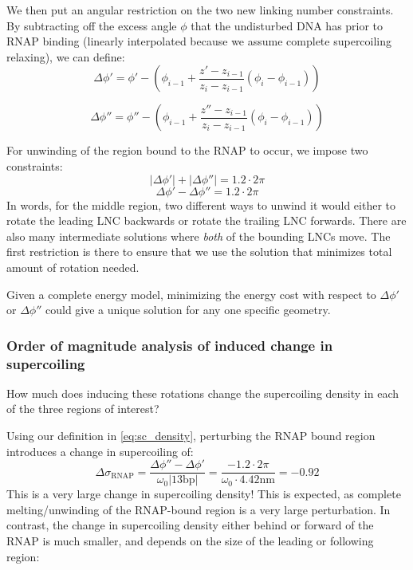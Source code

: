 \documentclass[11pt]{article}
\begin{document}
We then put an angular restriction on the two new linking number constraints. By subtracting off the excess angle \(\phi\) that the undisturbed DNA has prior to RNAP binding (linearly interpolated because we assume complete supercoiling relaxing), we can define:
\begin{equation}
    \Delta \phi' = \phi' - \left(\phi_{i - 1} + \frac{z' - z_{i-1}}{z_i - z_{i-1}} (\phi_i - \phi_{i-1})\right)
\end{equation}

\begin{equation}
    \Delta \phi'' = \phi'' - \left(\phi_{i - 1} + \frac{z'' - z_{i-1}}{z_i - z_{i-1}} (\phi_i - \phi_{i-1})\right)
\end{equation}

For unwinding of the region bound to the RNAP to occur, we impose two constraints:
\begin{equation}
    |\Delta \phi'| + |\Delta \phi''| = 1.2 \cdot 2 \pi
\end{equation}
\begin{equation}
    \Delta \phi' - \Delta \phi'' = 1.2 \cdot 2\pi
\end{equation}
In words, for the middle region, two different ways to unwind it would either to rotate the leading LNC backwards or rotate the trailing LNC forwards. There are also many intermediate solutions where \emph{both} of the bounding LNCs move. The first restriction is there to ensure that we use the solution that minimizes total amount of rotation needed.

Given a complete energy model, minimizing the energy cost with respect to \(\Delta \phi'\) or \(\Delta \phi''\) could give a unique solution for any one specific geometry.

\subsubsection{Order of magnitude analysis of induced change in supercoiling}
How much does inducing these rotations change the supercoiling density in each of the three regions of interest?

Using our definition in \autoref{eq:sc_density}, perturbing the RNAP bound region introduces a change in supercoiling of:
\begin{equation}
    \Delta \sigma_\text{RNAP} = \frac{\Delta \phi'' - \Delta \phi'}{\omega_0 |13 \text{bp}|} = \frac{-1.2 \cdot 2\pi}{\omega_0 \cdot 4.42 \text{nm}} = -0.92
    \label{eq:delta_sigma_rnap}
\end{equation}
This is a very large change in supercoiling density! This is expected, as complete melting/unwinding of the RNAP-bound region is a very large perturbation. In contrast, the change in supercoiling density either behind or forward of the RNAP is much smaller, and depends on the size of the leading or following region:
\end{document}
